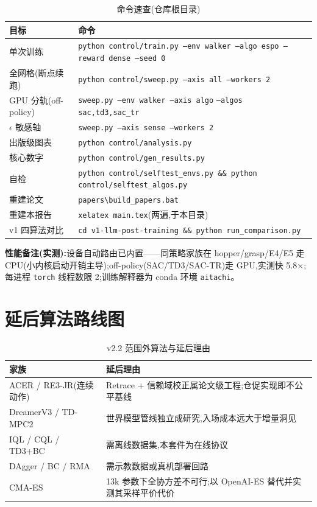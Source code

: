 \documentclass[11pt,a4paper]{ctexart}
\begin{document}
\begin{table}[H]
\centering
\caption{命令速查(仓库根目录)}
\footnotesize
\begin{tabular}{l l}
\toprule
目标 & 命令 \\
\midrule
单次训练 & \texttt{python control/train.py --env walker --algo espo --reward dense --seed 0} \\
全网格(断点续跑) & \texttt{python control/sweep.py --axis all --workers 2} \\
GPU 分轨(off-policy) & \texttt{sweep.py --env walker --axis algo} \texttt{--algos sac,td3,sac\_tr} \\
$\epsilon$ 敏感轴 & \texttt{sweep.py --axis sense --workers 2} \\
出版级图表 & \texttt{python control/analysis.py} \\
核心数字 & \texttt{python control/gen\_results.py} \\
自检 & \texttt{python control/selftest\_envs.py \&\& python control/selftest\_algos.py} \\
重建论文 & \texttt{papers\textbackslash build\_papers.bat} \\
重建本报告 & \texttt{xelatex main.tex}(两遍,于本目录) \\
v1 四算法对比 & \texttt{cd v1-llm-post-training \&\& python run\_comparison.py} \\
\bottomrule
\end{tabular}
\end{table}

\textbf{性能备注(实测):}设备自动路由已内置——同策略家族在 hopper/grasp/E4/E5 走 CPU(小内核启动开销主导);off-policy(SAC/TD3/SAC-TR)走 GPU,实测快 5.8$\times$;每进程 \texttt{torch} 线程数限 2;训练解释器为 conda 环境 \texttt{aitachi}。

\section{延后算法路线图}

\begin{table}[H]
\centering
\caption{v2.2 范围外算法与延后理由}
\small
\begin{tabular}{l p{10.2cm}}
\toprule
家族 & 延后理由 \\
\midrule
ACER / RE3-JR(连续动作) & Retrace + 信赖域校正属论文级工程;仓促实现即不公平基线 \\
DreamerV3 / TD-MPC2 & 世界模型管线独立成研究,入场成本远大于增量洞见 \\
IQL / CQL / TD3+BC & 需离线数据集,本套件为在线协议 \\
DAgger / BC / RMA & 需示教数据或真机部署回路 \\
CMA-ES & 13k 参数下全协方差不可行;以 OpenAI-ES 替代并实测其采样平价代价 \\
\bottomrule
\end{tabular}
\end{table}
\end{document}
